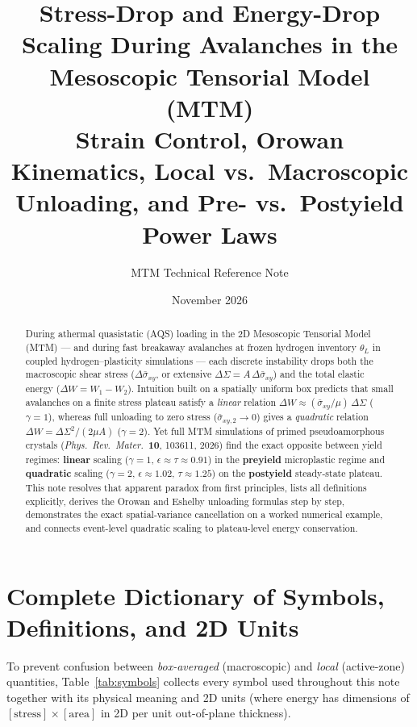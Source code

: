 \documentclass[11pt,a4paper]{article}
\title{\textbf{Stress-Drop and Energy-Drop Scaling During Avalanches in the Mesoscopic Tensorial Model (MTM)}\\[6pt]
\large Strain Control, Orowan Kinematics, Local vs.\ Macroscopic Unloading, and Pre- vs.\ Postyield Power Laws}
\author{MTM Technical Reference Note}
\date{November 2026}
\newcommand{\dS}{\Delta\Sigma}
\newcommand{\dW}{\Delta W}
\newcommand{\dsigbar}{\Delta\bar{\sigma}_{xy}}
\newcommand{\sigbar}{\bar{\sigma}_{xy}}
\begin{document}
\maketitle

\begin{abstract}
\noindent
During athermal quasistatic (AQS) loading in the 2D Mesoscopic Tensorial Model (MTM) --- and during fast breakaway avalanches at frozen hydrogen inventory $\theta_L$ in coupled hydrogen--plasticity simulations --- each discrete instability drops both the macroscopic shear stress ($\dsigbar$, or extensive $\dS = A\,\dsigbar$) and the total elastic energy ($\dW = W_1 - W_2$). Intuition built on a spatially uniform box predicts that small avalanches on a finite stress plateau satisfy a \emph{linear} relation $\dW \approx (\sigbar/\mu)\,\dS$ ($\gamma=1$), whereas full unloading to zero stress ($\bar{\sigma}_{xy,2}\to 0$) gives a \emph{quadratic} relation $\dW = \dS^2/(2\mu A)$ ($\gamma=2$). Yet full MTM simulations of primed pseudoamorphous crystals (\emph{Phys.\ Rev.\ Mater.}\ \textbf{10}, 103611, 2026) find the exact opposite between yield regimes: \textbf{linear} scaling ($\gamma=1$, $\epsilon \approx \tau \approx 0.91$) in the \textbf{preyield} microplastic regime and \textbf{quadratic} scaling ($\gamma=2$, $\epsilon \approx 1.02$, $\tau \approx 1.25$) on the \textbf{postyield} steady-state plateau. This note resolves that apparent paradox from first principles, lists all definitions explicitly, derives the Orowan and Eshelby unloading formulas step by step, demonstrates the exact spatial-variance cancellation on a worked numerical example, and connects event-level quadratic scaling to plateau-level energy conservation.
\end{abstract}

\tableofcontents
\bigskip

\section{Complete Dictionary of Symbols, Definitions, and 2D Units}
\label{sec:definitions}

To prevent confusion between \emph{box-averaged} (macroscopic) and \emph{local} (active-zone) quantities, Table~\ref{tab:symbols} collects every symbol used throughout this note together with its physical meaning and 2D units (where energy has dimensions of $[\text{stress}]\times[\text{area}]$ in 2D per unit out-of-plane thickness).
\end{document}

